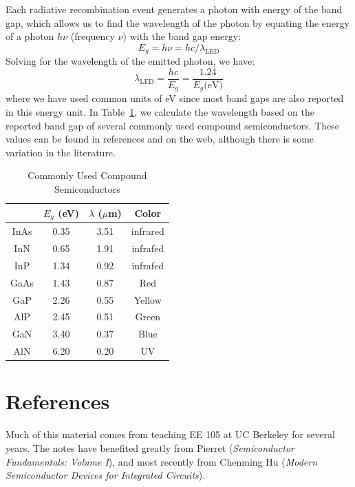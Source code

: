 Each radiative recombination event generates a photon with energy of the band gap, which allows us to find the wavelength of the photon by equating the energy of a photon $h \nu$ (frequency $\nu$) with the band gap energy:
\begin{equation} 
	E_g = h \nu = h c / \lambda_{\text{LED}} 
\end{equation}
Solving for the wavelength of the emitted photon, we have:
\begin{equation} 
	\lambda_{\text{LED}} = \frac{hc}{E_g} = \frac{1.24}{E_g \text{(eV)}}
\end{equation}
where we have used common units of eV since most band gaps are also reported in this energy unit.  In Table~\ref{tab:rainbow}, we calculate the wavelength based on the reported band gap of several commonly used compound semiconductors.  These values can be found in references and on the web, although there is some variation in the literature.
\begin{table}[htbp]
\begin{center}
  \caption{Commonly Used Compound Semiconductors}
    \begin{tabular}{cccc}
    \toprule
    & $E_g$ (eV) & $\lambda$ ($\mu$m) & \textbf{Color} \\
    \midrule
    \rowcolor[rgb]{ .851,  .851,  .851} InAs  & 0.35  & 3.51  & infrared \\
    InN   & 0.65  & 1.91  & infrafed \\
    \rowcolor[rgb]{ .851,  .851,  .851} InP   & 1.34  & 0.92  & infrafed \\
    GaAs  & 1.43  & 0.87  & Red \\
    \rowcolor[rgb]{ .851,  .851,  .851} GaP   & 2.26  & 0.55  & Yellow \\
    AlP   & 2.45  & 0.51  & Green \\
    \rowcolor[rgb]{ .851,  .851,  .851} GaN   & 3.40  & 0.37  & Blue \\
    AlN   & 6.20  & 0.20  & UV \\
    \bottomrule
    \end{tabular}
  \label{tab:rainbow}
\end{center}
\end{table}
\section{References}
Much of this material comes from teaching EE 105 at UC Berkeley for several years.  The notes have benefited greatly from Pierret (\emph{Semiconductor Fundamentals: Volume I}), and most recently from Chenming Hu (\emph{Modern Semiconductor Devices for Integrated Circuits}).
